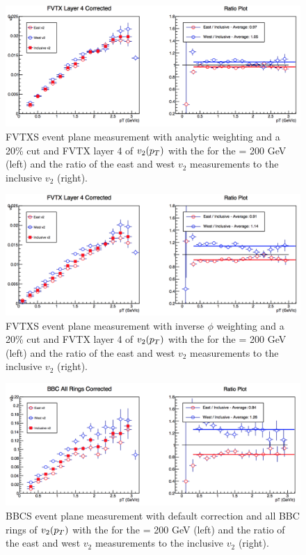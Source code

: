 \begin{figure}[!ht]
\centering
\includegraphics[width=0.65\linewidth]{figs/fvtx_4_analytic.png}
\caption{FVTXS event plane measurement with analytic weighting and a 20\% cut and FVTX layer 4 of $v_{2}(\mbox{$p_T$})$ with the  for the \pau \sqsn = 200 GeV (left) and the ratio of the east and west $v_2$ measurements to the inclusive $v_2$ (right).}
\end{figure}

\begin{figure}[!ht]
\centering
\includegraphics[width=0.65\linewidth]{figs/fvtx_4_data_cut.png}
\caption{FVTXS event plane measurement with inverse $\phi$ weighting and a 20\% cut and FVTX layer 4 of $v_{2}(\mbox{$p_T$})$ with the  for the \pau \sqsn = 200 GeV (left) and the ratio of the east and west $v_2$ measurements to the inclusive $v_2$ (right).}
\end{figure}

\begin{figure}[!ht]
\centering
\includegraphics[width=0.65\linewidth]{figs/bbc_all_default.png}
\caption{BBCS event plane measurement with default correction and all BBC rings of $v_{2}(\mbox{$p_T$})$ with the  for the \pau \sqsn = 200 GeV (left) and the ratio of the east and west $v_2$ measurements to the inclusive $v_2$ (right).}
\end{figure}

